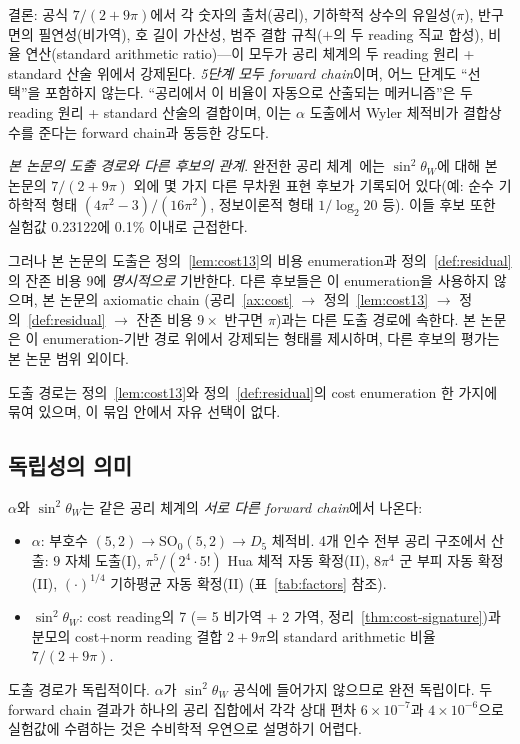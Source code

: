 \documentclass[entropy,article,submit,pdftex,oneauthor]{Definitions/mdpi}
\begin{document}
결론: 공식 $7/(2+9\pi)$에서 각 숫자의 출처(공리), 기하학적 상수의 유일성($\pi$), 반구면의 필연성(비가역), 호 길이 가산성, 범주 결합 규칙($+$의 두 reading 직교 합성), 비율 연산(standard arithmetic ratio)---이 모두가 공리 체계의 두 reading 원리 + standard 산술 위에서 강제된다. \emph{5단계 모두 forward chain}이며, 어느 단계도 ``선택''을 포함하지 않는다. ``공리에서 이 비율이 자동으로 산출되는 메커니즘''은 두 reading 원리 + standard 산술의 결합이며, 이는 $\alpha$ 도출에서 Wyler 체적비가 결합상수를 준다는 forward chain과 동등한 강도다.

\emph{본 논문의 도출 경로와 다른 후보의 관계}. 완전한 공리 체계~\cite{han2026}에는 $\sin^2\theta_W$에 대해 본 논문의 $7/(2+9\pi)$ 외에 몇 가지 다른 무차원 표현 후보가 기록되어 있다(예: 순수 기하학적 형태 $(4\pi^2-3)/(16\pi^2)$, 정보이론적 형태 $1/\log_2 20$ 등). 이들 후보 또한 실험값 0.23122에 0.1\% 이내로 근접한다.

그러나 본 논문의 도출은 정의~\ref{lem:cost13}의 비용 enumeration과 정의~\ref{def:residual}의 잔존 비용 $9$에 \emph{명시적으로} 기반한다. 다른 후보들은 이 enumeration을 사용하지 않으며, 본 논문의 axiomatic chain (공리~\ref{ax:cost} $\to$ 정의~\ref{lem:cost13} $\to$ 정의~\ref{def:residual} $\to$ 잔존 비용 $9 \times$ 반구면 $\pi$)과는 다른 도출 경로에 속한다. 본 논문은 이 enumeration-기반 경로 위에서 강제되는 형태를 제시하며, 다른 후보의 평가는 본 논문 범위 외이다.

도출 경로는 정의~\ref{lem:cost13}와 정의~\ref{def:residual}의 cost enumeration 한 가지에 묶여 있으며, 이 묶임 안에서 자유 선택이 없다.

\subsection{독립성의 의미}

$\alpha$와 $\sin^2\theta_W$는 같은 공리 체계의 \emph{서로 다른 forward chain}에서 나온다:
\begin{itemize}
\item $\alpha$: 부호수 $(5,2) \to \mathrm{SO}_0(5,2) \to D_5$ 체적비. 4개 인수 전부 공리 구조에서 산출: $9$ 자체 도출(I), $\pi^5/(2^4 \cdot 5!)$ Hua 체적 자동 확정(II), $8\pi^4$ 군 부피 자동 확정(II), $(\cdot)^{1/4}$ 기하평균 자동 확정(II) (표~\ref{tab:factors} 참조).
\item $\sin^2\theta_W$: cost reading의 7 (= 5 비가역 + 2 가역, 정리~\ref{thm:cost-signature})과 분모의 cost+norm reading 결합 $2 + 9\pi$의 standard arithmetic 비율 $7/(2 + 9\pi)$.
\end{itemize}
도출 경로가 독립적이다. $\alpha$가 $\sin^2\theta_W$ 공식에 들어가지 않으므로 완전 독립이다. 두 forward chain 결과가 하나의 공리 집합에서 각각 상대 편차 $6 \times 10^{-7}$과 $4 \times 10^{-6}$으로 실험값에 수렴하는 것은 수비학적 우연으로 설명하기 어렵다.
\end{document}
